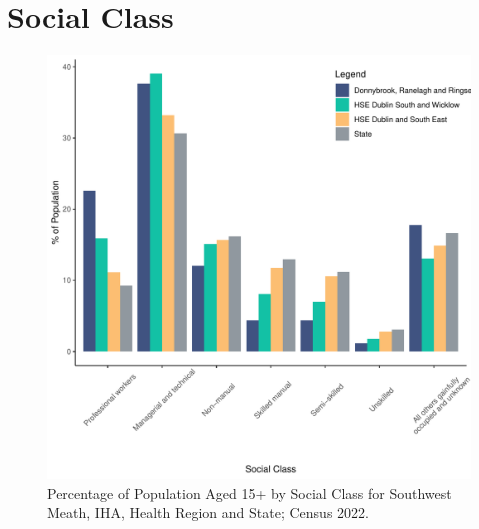 \documentclass{article}
\begin{document}
\section{Social Class}\label{sect:SC}
\begin{figure}[H]
	\centering
	\includegraphics[width = 140mm]{../figures/SocialClassED.pdf}
	\caption{Percentage of Population Aged 15+ by Social Class for Southwest Meath, IHA, Health Region and State; Census 2022.}
	\label{fig:vbnv}
	\end{figure}
\end{document}
